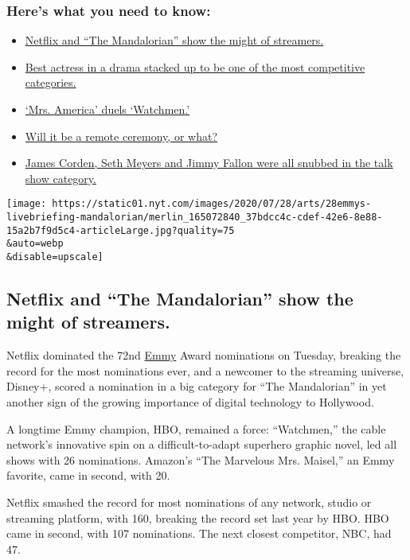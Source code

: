 \hypertarget{heres-what-you-need-to-know}{%
\subsubsection{Here's what you need to
know:}\label{heres-what-you-need-to-know}}

\begin{itemize}
\tightlist
\item
  \protect\hyperlink{link-371a3cd4}{Netflix and ``The Mandalorian'' show
  the might of streamers.}
\item
  \protect\hyperlink{link-4832be22}{Best actress in a drama stacked up
  to be one of the most competitive categories.}
\item
  \protect\hyperlink{link-70dd8295}{`Mrs. America' duels `Watchmen.'}
\item
  \protect\hyperlink{link-55c82a59}{Will it be a remote ceremony, or
  what?}
\item
  \protect\hyperlink{link-75cb73af}{James Corden, Seth Meyers and Jimmy
  Fallon were all snubbed in the talk show category.}
\end{itemize}

\texttt{[image: https://static01.nyt.com/images/2020/07/28/arts/28emmys-livebriefing-mandalorian/merlin\_165072840\_37bdcc4c-cdef-42e6-8e88-15a2b7f9d5c4-articleLarge.jpg?quality=75\\\&auto=webp\\\&disable=upscale]}

\hypertarget{netflix-and-the-mandalorian-show-the-might-of-streamers}{%
\subsection{Netflix and ``The Mandalorian'' show the might of
streamers.}\label{netflix-and-the-mandalorian-show-the-might-of-streamers}}

Netflix dominated the 72nd
\href{https://www.nytimes.com/news-event/emmy-awards}{Emmy} Award
nominations on Tuesday, breaking the record for the most nominations
ever, and a newcomer to the streaming universe, Disney+, scored a
nomination in a big category for ``The Mandalorian'' in yet another sign
of the growing importance of digital technology to Hollywood.

A longtime Emmy champion, HBO, remained a force: ``Watchmen,'' the cable
network's innovative spin on a difficult-to-adapt superhero graphic
novel, led all shows with 26 nominations. Amazon's ``The Marvelous Mrs.
Maisel,'' an Emmy favorite, came in second, with 20.

Netflix smashed the record for most nominations of any network, studio
or streaming platform, with 160, breaking the record set last year by
HBO. HBO came in second, with 107 nominations. The next closest
competitor, NBC, had 47.


